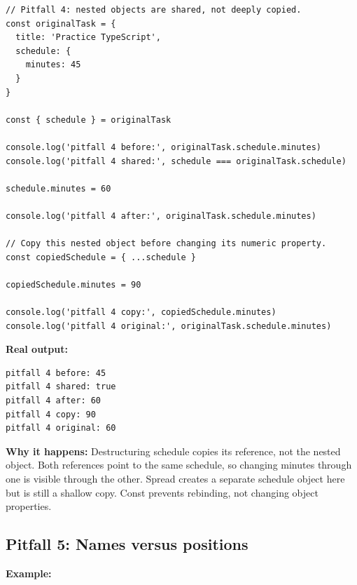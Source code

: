 \documentclass[10pt,a4paper]{article}
\begin{document}
\begin{lstlisting}[language=GuideJS]
// Pitfall 4: nested objects are shared, not deeply copied.
const originalTask = {
  title: 'Practice TypeScript',
  schedule: {
    minutes: 45
  }
}

const { schedule } = originalTask

console.log('pitfall 4 before:', originalTask.schedule.minutes)
console.log('pitfall 4 shared:', schedule === originalTask.schedule)

schedule.minutes = 60

console.log('pitfall 4 after:', originalTask.schedule.minutes)

// Copy this nested object before changing its numeric property.
const copiedSchedule = { ...schedule }

copiedSchedule.minutes = 90

console.log('pitfall 4 copy:', copiedSchedule.minutes)
console.log('pitfall 4 original:', originalTask.schedule.minutes)
\end{lstlisting}


\textbf{Real output:}

\begin{lstlisting}[language={}]
pitfall 4 before: 45
pitfall 4 shared: true
pitfall 4 after: 60
pitfall 4 copy: 90
pitfall 4 original: 60
\end{lstlisting}

\textbf{Why it happens:} Destructuring schedule copies its reference, not the nested object. Both references point to the same schedule, so changing minutes through one is visible through the other. Spread creates a separate schedule object here but is still a shallow copy. Const prevents rebinding, not changing object properties.

\subsection{Pitfall 5: Names versus positions}


\textbf{Example:}
\end{document}
